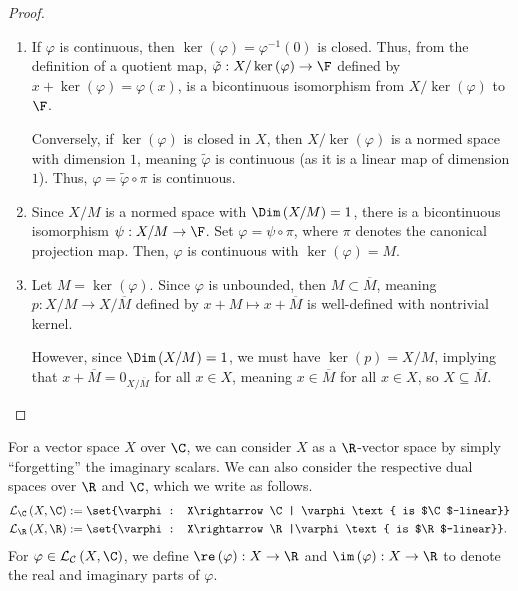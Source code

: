 \documentclass[10pt]{mypackage}
\begin{document}
  \begin{proof}\hfill
    \begin{enumerate}[(1)]
      \item If $\varphi$ is continuous, then $\ker\left(\varphi\right) = \varphi^{-1}\left(0\right)$ is closed. Thus, from the definition of a quotient map, $\tilde{\varphi}: X/\ker\left(\varphi\right) \rightarrow \F$ defined by $x + \ker\left(\varphi\right) = \varphi(x)$, is a bicontinuous isomorphism from $X/\ker\left(\varphi\right)$ to $\F$.\newline

        Conversely, if $\ker\left(\varphi\right)$ is closed in $X$, then $X/\ker\left(\varphi\right)$ is a normed space with dimension $1$, meaning $\tilde{\varphi}$ is continuous (as it is a linear map of dimension $1$). Thus, $\varphi = \tilde{\varphi}\circ \pi$ is continuous.
      \item Since $X/M$ is a normed space with $\Dim\left(X/M\right) = 1$, there is a bicontinuous isomorphism $\psi: X/M\rightarrow \F$. Set $\varphi = \psi\circ\pi$, where $\pi$ denotes the canonical projection map. Then, $\varphi$ is continuous with $\ker\left(\varphi\right) = M$.
      \item Let $M = \ker\left(\varphi\right)$. Since $\varphi$ is unbounded, then $M\subset \overline{M}$, meaning $p: X/M\rightarrow X/\overline{M}$ defined by $x+M \mapsto x + \overline{M}$ is well-defined with nontrivial kernel.\newline

        However, since $\Dim\left(X/M\right) = 1$, we must have $\ker\left(p\right) = X/M$, implying that $x+\overline{M} = 0_{X/\overline{M}}$ for all $x\in X$, meaning $x\in \overline{M}$ for all $x\in X$, so $X\subseteq \overline{M}$.
    \end{enumerate}
  \end{proof}
  For a vector space $X$ over $\C$, we can consider $X$ as a $\R$-vector space by simply ``forgetting'' the imaginary scalars. We can also consider the respective dual spaces over $\R$ and $\C$, which we write as follows.
  \begin{align*}
    \mathcal{L}_{\C}\left(X,\C\right) &:= \set{\varphi: X\rightarrow \C| \varphi\text{ is $\C$-linear}}\\
    \mathcal{L}_{\R}\left(X,\R\right) &:= \set{\varphi: X\rightarrow \R|\varphi\text{ is $\R$-linear}}.
  \end{align*}
  For $\varphi\in \mathcal{L}_{\mathcal{C}}\left(X,\C\right)$, we define $\re\left(\varphi\right): X\rightarrow \R$ and $\im\left(\varphi\right): X\rightarrow \R$ to denote the real and imaginary parts of $\varphi$.
\end{document}
